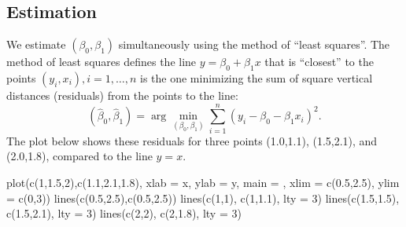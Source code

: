 \documentclass[
]{book}
\newenvironment{Shaded}{\begin{snugshade}}{\end{snugshade}}
\newcommand{\AttributeTok}[1]{\textcolor[rgb]{0.77,0.63,0.00}{#1}}
\newcommand{\DecValTok}[1]{\textcolor[rgb]{0.00,0.00,0.81}{#1}}
\newcommand{\FloatTok}[1]{\textcolor[rgb]{0.00,0.00,0.81}{#1}}
\newcommand{\FunctionTok}[1]{\textcolor[rgb]{0.00,0.00,0.00}{#1}}
\newcommand{\NormalTok}[1]{#1}
\newcommand{\StringTok}[1]{\textcolor[rgb]{0.31,0.60,0.02}{#1}}
\begin{document}
\hypertarget{estimation}{%
\subsection{Estimation}\label{estimation}}

We estimate \((\beta_0, \beta_1)\) simultaneously using the method of ``least squares''. The method of least squares defines the line \(y = \beta_0 + \beta_1 x\) that is ``closest'' to the points \((y_i, x_i), i=1, \ldots, n\) is the one minimizing the sum of square vertical distances (residuals) from the points to the line:
\[(\hat\beta_0, \hat\beta_1) = \arg\min_{(\beta_0, \beta_1)}\sum_{i=1}^n(y_i - \beta_0 - \beta_1x_i)^2.\]
The plot below shows these residuals for three points (1.0,1.1), (1.5,2.1), and (2.0,1.8), compared to the line \(y=x\).

\begin{Shaded}
\begin{Highlighting}[]
\FunctionTok{plot}\NormalTok{(}\FunctionTok{c}\NormalTok{(}\DecValTok{1}\NormalTok{,}\FloatTok{1.5}\NormalTok{,}\DecValTok{2}\NormalTok{),}\FunctionTok{c}\NormalTok{(}\FloatTok{1.1}\NormalTok{,}\FloatTok{2.1}\NormalTok{,}\FloatTok{1.8}\NormalTok{), }\AttributeTok{xlab =} \StringTok{\textquotesingle{}x\textquotesingle{}}\NormalTok{, }\AttributeTok{ylab =} \StringTok{\textquotesingle{}y\textquotesingle{}}\NormalTok{, }\AttributeTok{main =} \StringTok{\textquotesingle{}\textquotesingle{}}\NormalTok{, }\AttributeTok{xlim =} \FunctionTok{c}\NormalTok{(}\FloatTok{0.5}\NormalTok{,}\FloatTok{2.5}\NormalTok{), }\AttributeTok{ylim =} \FunctionTok{c}\NormalTok{(}\DecValTok{0}\NormalTok{,}\DecValTok{3}\NormalTok{))}
\FunctionTok{lines}\NormalTok{(}\FunctionTok{c}\NormalTok{(}\FloatTok{0.5}\NormalTok{,}\FloatTok{2.5}\NormalTok{),}\FunctionTok{c}\NormalTok{(}\FloatTok{0.5}\NormalTok{,}\FloatTok{2.5}\NormalTok{))}
\FunctionTok{lines}\NormalTok{(}\FunctionTok{c}\NormalTok{(}\DecValTok{1}\NormalTok{,}\DecValTok{1}\NormalTok{), }\FunctionTok{c}\NormalTok{(}\DecValTok{1}\NormalTok{,}\FloatTok{1.1}\NormalTok{), }\AttributeTok{lty =} \DecValTok{3}\NormalTok{)}
\FunctionTok{lines}\NormalTok{(}\FunctionTok{c}\NormalTok{(}\FloatTok{1.5}\NormalTok{,}\FloatTok{1.5}\NormalTok{), }\FunctionTok{c}\NormalTok{(}\FloatTok{1.5}\NormalTok{,}\FloatTok{2.1}\NormalTok{), }\AttributeTok{lty =} \DecValTok{3}\NormalTok{)}
\FunctionTok{lines}\NormalTok{(}\FunctionTok{c}\NormalTok{(}\DecValTok{2}\NormalTok{,}\DecValTok{2}\NormalTok{), }\FunctionTok{c}\NormalTok{(}\DecValTok{2}\NormalTok{,}\FloatTok{1.8}\NormalTok{), }\AttributeTok{lty =} \DecValTok{3}\NormalTok{)}
\end{Highlighting}
\end{Shaded}
\end{document}
